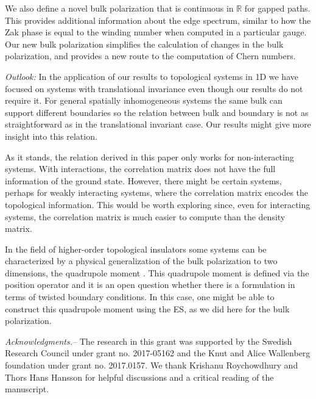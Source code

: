 \documentclass[twocolumn,amsmath,longbibliography,amssymb,superscriptaddress]{revtex4-1}
\begin{document}
We also define a novel bulk polarization that is continuous in $\mathbb{R}$ for gapped paths. This provides additional information about the edge spectrum, similar to how the Zak phase is equal to the winding number when computed in a particular gauge. Our new bulk polarization simplifies the calculation of changes in the bulk polarization, and provides a new route to the computation of Chern numbers.

\emph{Outlook:} In the application of our results to topological systems in 1D we have focused on systems with translational invariance even though our results do not require it. For general spatially inhomogeneous systems the same bulk can support different boundaries so the relation between bulk and boundary is not as straightforward as in the translational invariant case. Our results might give more insight into this relation. 

As it stands, the relation derived in this paper only works for non-interacting systems. With interactions, the correlation matrix does not have the full information of the ground state. However, there might be certain systems, perhaps for weakly interacting systems, where the correlation matrix encodes the topological information. This would be worth exploring since, even for interacting systems, the correlation matrix is much easier to compute than the density matrix.

In the field of higher-order topological insulators some systems can be characterized by a physical generalization of the bulk polarization to two dimensions, the quadrupole moment \cite{Benalcazar2017,Kang2019}. This quadrupole moment is defined via the position operator and it is an open question whether there is a formulation in terms of twisted boundary conditions. In this case, one might be able to construct this quadrupole moment using the ES, as we did
 here for the bulk polarization.

\acknowledgments
{\em Acknowledgments.--} 
The research in this grant was supported by the Swedish Research Council under grant no. 2017-05162 and the Knut and Alice Wallenberg foundation under grant no. 2017.0157. 
We thank Krishanu Roychowdhury and Thors Hans Hansson for helpful discussions and a critical reading of the manuscript. 

	

	
\appendix

\end{document}
